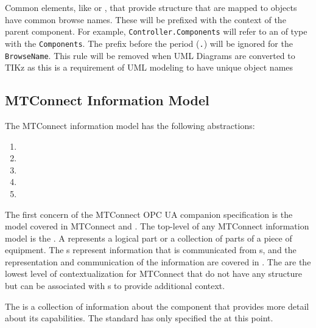Common elements, like  or , that provide structure that are mapped to  objects have common browse names. These will be prefixed with the context of the parent component. For example, \texttt{Controller.Components} will refer to an  of type  with the  \texttt{Components}. The prefix before the period (\texttt{.}) will be ignored for the \texttt{BrowseName}. {\color{red} This rule will be removed when UML Diagrams are converted to TIKz as this is a requirement of UML modeling to have unique object names}

\FloatBarrier

\subsection{MTConnect Information Model}

The MTConnect information model has the following abstractions:

\begin{enumerate}
\item {}
\item {}
\item {}
\item {}
\item {}
\end{enumerate}

The first concern of the MTConnect OPC UA companion specification is the  model covered in MTConnect \cite{MTCPart2} and \cite{MTCPart3}. The top-level  of any MTConnect information model is the . A  represents a logical part or a collection of parts of a piece of equipment. The s represent information that is communicated from s, and the representation and communication of the information are covered in \cite{MTCPart3}. The  are the lowest level of contextualization for MTConnect  that do not have any structure but can be associated with s to provide additional context. 

The  is a collection of information about the component that provides more detail about its capabilities. The standard has only specified the  at this point.

